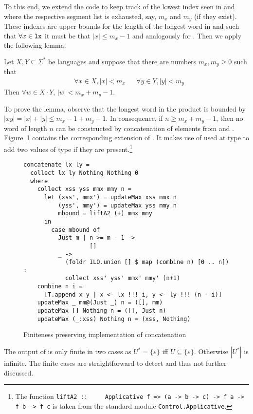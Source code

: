 To this end, we extend the code to keep track of the lowest index
seen in  and  where the respective segment list is
exhausted, say, $m_x$ and $m_y$ (if they exist). These indexes
are upper bounds for the length of the longest word in  and
 such that $\forall x \in \code{lx}$ it must be that
$|x|\le m_x-1$ and analogously for . Then we apply the
following lemma.
\begin{lemma}
  Let $X, Y \subseteq \Sigma^*$ be languages and suppose that there
  are numbers $m_x, m_y \ge 0$ such that
  \begin{align*}
    & \forall x \in X, |x| < m_x
    && \forall y \in Y, |y| < m_y
  \end{align*}
  Then $\forall w\in X\cdot Y$, $|w| < m_x + m_y -1$.
\end{lemma}
To prove the lemma, observe that the longest word in
the product is bounded by $|xy| = |x| + |y| \le m_x -1 + m_y -1$. In
consequence, if $n \ge m_x + m_y - 1$, then no word of
length $n$ can be constructed by concatenation of elements from
 and
. Figure~\ref{fig:finite-concatenation-segmented} contains
the corresponding extension of . It makes use of
 used at type
to add two values of type  if they are present.\footnote{The function \lstinline{liftA2 ::
    Applicative f => (a -> b -> c) -> f a -> f b -> f c} is taken from
the standard module \lstinline{Control.Applicative}.}
\begin{figure}[tp]
\begin{lstlisting}
concatenate lx ly =
  collect lx ly Nothing Nothing 0
  where
    collect xss yss mmx mmy n =
      let (xss', mmx') = updateMax xss mmx n
          (yss', mmy') = updateMax yss mmy n
          mbound = liftA2 (+) mmx mmy
      in
        case mbound of
          Just m | n >= m - 1 ->
                   []
          _ ->
            (foldr ILO.union [] $ map (combine n) [0 .. n]) :
            collect xss' yss' mmx' mmy' (n+1)
    combine n i =
      [T.append x y | x <- lx !!! i, y <- ly !!! (n - i)]
    updateMax _ mm@(Just _) n = ([], mm)
    updateMax [] Nothing n = ([], Just n)
    updateMax (_:xss) Nothing n = (xss, Nothing)
\end{lstlisting}
  \caption{Finiteness preserving implementation of concatenation}
  \label{fig:finite-concatenation-segmented}
\end{figure}

The output of  is only finite in two cases as $U^* = \{\varepsilon\}$ iff
$U\subseteq\{\varepsilon\}$. Otherwise $|U^*|$ is infinite.
The finite cases are straightforward to detect and thus not further discussed.

